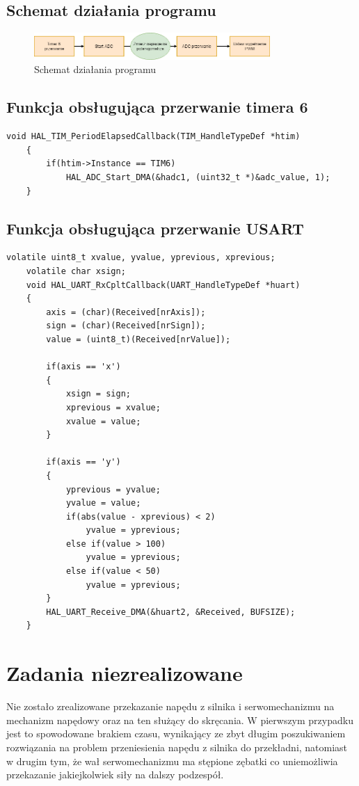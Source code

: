 \documentclass[10pt, a4paper]{article}
\begin{document}
\subsection{Schemat działania programu}
	\begin{figure}[H]
		\centering
		\includegraphics[width=0.8\textwidth]{figures/diagramPWM.png}
		\caption{Schemat działania programu}
		\label{fig:diagramPWM}
	\end{figure}

\subsection{Funkcja obsługująca przerwanie timera 6}
	\begin{lstlisting}[tabsize=2]
	void HAL_TIM_PeriodElapsedCallback(TIM_HandleTypeDef *htim)
	{
		if(htim->Instance == TIM6)
			HAL_ADC_Start_DMA(&hadc1, (uint32_t *)&adc_value, 1);
	}
	\end{lstlisting}

\subsection{Funkcja obsługująca przerwanie USART}

	\begin{lstlisting}[tabsize=2]
	volatile uint8_t xvalue, yvalue, yprevious, xprevious;
	volatile char xsign;
	void HAL_UART_RxCpltCallback(UART_HandleTypeDef *huart) 
	{
		axis = (char)(Received[nrAxis]);
		sign = (char)(Received[nrSign]);
		value = (uint8_t)(Received[nrValue]);
		
		if(axis == 'x')
		{
			xsign = sign;
			xprevious = xvalue;
			xvalue = value;
		}
		
		if(axis == 'y')
		{
			yprevious = yvalue;
			yvalue = value;
			if(abs(value - xprevious) < 2)
				yvalue = yprevious;
			else if(value > 100)
				yvalue = yprevious;
			else if(value < 50)
				yvalue = yprevious;
		}
		HAL_UART_Receive_DMA(&huart2, &Received, BUFSIZE);
	}
	\end{lstlisting}

\section{Zadania niezrealizowane}
Nie zostało zrealizowane przekazanie napędu z silnika i serwomechanizmu na mechanizm napędowy oraz na ten służący do skręcania. W pierwszym przypadku jest to spowodowane brakiem czasu, wynikający ze zbyt długim poszukiwaniem rozwiązania na problem przeniesienia napędu z silnika do przekładni, natomiast w drugim tym, że wał serwomechanizmu ma stępione zębatki co uniemożliwia przekazanie jakiejkolwiek siły na dalszy podzespół.
\end{document}

